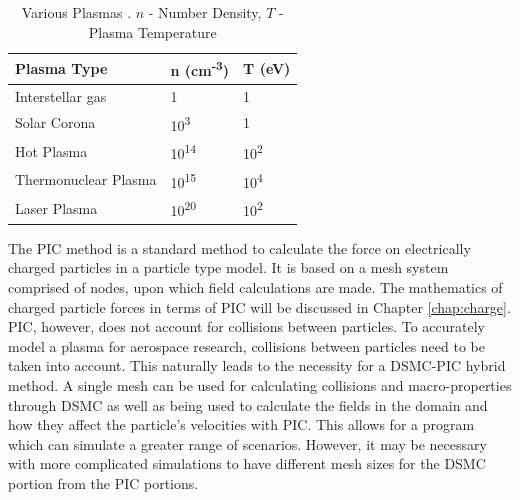 \begin{table}
\caption[Various Plasmas]{Various Plasmas \textmd{\cite{plasma_table}. \(n\) - Number Density, \(T\) - Plasma Temperature}}
\label{tab:plasma}
\vspace{0.3cm}
\begin{center}
\begin{tabular}{|lll|}
\hline
Plasma Type          & n (cm\textsuperscript{-3}) & T (eV)                  \\ \hline
Interstellar gas     & 1                        & 1                     \\
Solar Corona         & 10\textsuperscript{3}    & 1                     \\
Hot Plasma           & 10\textsuperscript{14}   & 10\textsuperscript{2} \\
Thermonuclear Plasma & 10\textsuperscript{15}   & 10\textsuperscript{4} \\
Laser Plasma         & 10\textsuperscript{20}   & 10\textsuperscript{2} \\ \hline
\end{tabular}
\end{center}
\end{table}

\indent The PIC method is a standard method to calculate the force on electrically charged particles in a particle type model. It is based on a mesh system comprised of nodes, upon which field calculations are made. The mathematics of charged particle forces in terms of PIC will be discussed in Chapter \ref{chap:charge}. PIC, however, does not account for collisions between particles. To accurately model a plasma for aerospace research, collisions between particles need to be taken into account. This naturally leads to the necessity for a DSMC-PIC hybrid method. A single mesh can be used for calculating collisions and macro-properties through DSMC as well as being used to calculate the fields in the domain and how they affect the particle's velocities with PIC. This allows for a program which can simulate a greater range of scenarios. However, it may be necessary with more complicated simulations to have different mesh sizes for the DSMC portion from the PIC portions. \par


